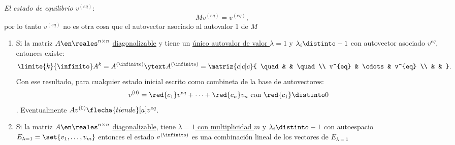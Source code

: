 
\item \textit{El estado de equilibrio $v^{(eq)}$}:
$$
  M v^{(eq)} = v^{(eq)},
$$
por lo tanto $v^{(eq)}$ no es otra cosa que el autovector asociado al autovalor 1 de $M$
\begin{enumerate}[label=\blue{\tiny\faIcon{pray}$_{\arabic*}$}]
  \item Si la matriz $A \en \reales^{n \times n}$ \ul{diagonalizable} y tiene un \ul{único autovalor de valor $\lambda = 1$} y
        $\lambda_i \distinto -1$ con autovector asociado $v^{eq}$, entonces existe:
        $$
          \limite{k}{\infinito} A^k = A^{(\infinito)}
          \ytext
          A^{(\infinito)} =
          \matriz{c|c|c}{
            \quad &  & \quad \\
            v^{eq} & \cdots & v^{eq} \\
            &  &
          }.
        $$
        Con ese resultado, para cualquier estado inicial escrito como combineta de la base de autovectores:
        $$
          v^{(0)} = \red{c_1} v^{eq} + \cdots +  \red{c_n}v_n \text { con }  \red{c_1} \distinto 0
        $$.
        Eventualmente $A v^{(0)} \flecha{tiende}[a] v^{eq}$.

  \item Si la matriz $A\en \reales^{n \times n}$ \ul{diagonalizable}, tiene \ul{$\lambda = 1$ con multiplicidad $m$} y $\lambda_i \distinto -1$ con
        autoespacio $E_{\lambda = 1} = \set{v_1, \ldots, v_m}$
        entonces el estado $v^{(\infinito)}$ es una combinación lineal de los vectores de $E_{\lambda = 1}$
\end{enumerate}

